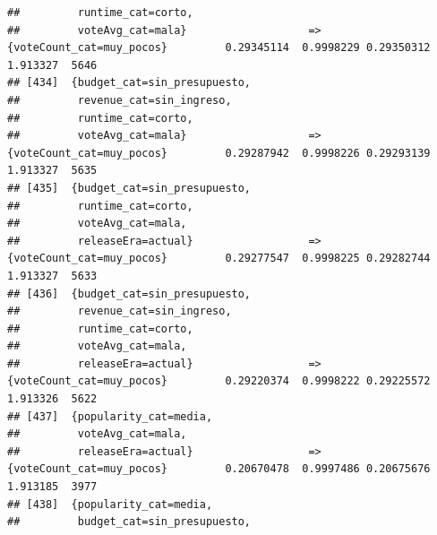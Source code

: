 \documentclass[
]{article}
\begin{document}
\begin{verbatim}
##         runtime_cat=corto,                                                                                                      
##         voteAvg_cat=mala}                   => {voteCount_cat=muy_pocos}         0.29345114  0.9998229 0.29350312 1.913327  5646
## [434]  {budget_cat=sin_presupuesto,                                                                                             
##         revenue_cat=sin_ingreso,                                                                                                
##         runtime_cat=corto,                                                                                                      
##         voteAvg_cat=mala}                   => {voteCount_cat=muy_pocos}         0.29287942  0.9998226 0.29293139 1.913327  5635
## [435]  {budget_cat=sin_presupuesto,                                                                                             
##         runtime_cat=corto,                                                                                                      
##         voteAvg_cat=mala,                                                                                                       
##         releaseEra=actual}                  => {voteCount_cat=muy_pocos}         0.29277547  0.9998225 0.29282744 1.913327  5633
## [436]  {budget_cat=sin_presupuesto,                                                                                             
##         revenue_cat=sin_ingreso,                                                                                                
##         runtime_cat=corto,                                                                                                      
##         voteAvg_cat=mala,                                                                                                       
##         releaseEra=actual}                  => {voteCount_cat=muy_pocos}         0.29220374  0.9998222 0.29225572 1.913326  5622
## [437]  {popularity_cat=media,                                                                                                   
##         voteAvg_cat=mala,                                                                                                       
##         releaseEra=actual}                  => {voteCount_cat=muy_pocos}         0.20670478  0.9997486 0.20675676 1.913185  3977
## [438]  {popularity_cat=media,                                                                                                   
##         budget_cat=sin_presupuesto,                                                                                             

\end{verbatim}
\end{document}
